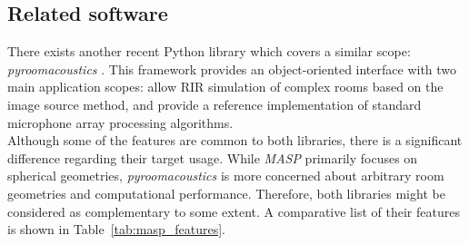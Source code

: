 \subsection{Related software}

There exists another recent Python library which covers a similar scope: \textit{pyroomacoustics} \cite{scheibler2018pyroomacoustics}.
This framework provides an object-oriented interface with two main application scopes: allow RIR simulation of complex rooms based on the image source method, and provide a reference implementation of standard microphone array processing algorithms. \\

Although some of the features are common to both libraries, there is a significant difference regarding their target usage. While \textit{MASP} primarily focuses on spherical geometries, \textit{pyroomacoustics} is more concerned about arbitrary room geometries and computational performance. 
Therefore, both libraries might be considered as complementary to some extent. 
A comparative list of their features is shown in Table~\ref{tab:masp_features}.



